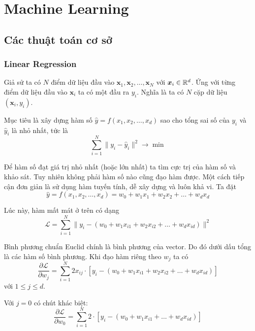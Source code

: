 \chapter{Machine Learning}

\section{Các thuật toán cơ sở}

\subsection*{Linear Regression}

Giả sử ta có $N$ điểm dữ liệu đầu vào $\bm{x}_1, \bm{x}_2, \ldots, \bm{x}_N$ với $\bm{x}_i \in \mathbb{R}^d$. Ứng với từng điểm dữ liệu đầu vào $\bm{x}_i$ ta có một đầu ra $y_i$. Nghĩa là ta có $N$ cặp dữ liệu $(\bm{x}_i, y_i)$.

Mục tiêu là xây dựng hàm số $\hat{y} = f(x_1, x_2, \ldots, x_d)$ sao cho tổng sai số của $y_i$ và $\hat{y}_i$ là nhỏ nhất, tức là \[ \sum_{i=1}^N \lVert y_i - \hat{y}_i \rVert^2 \to \min \]

Để hàm số đạt giá trị nhỏ nhất (hoặc lớn nhất) ta tìm cực trị của hàm số và khảo sát. Tuy nhiên không phải hàm số nào cũng đạo hàm được. Một cách tiếp cận đơn giản là sử dụng hàm tuyến tính, dễ xây dựng và luôn khả vi. Ta đặt \[ \hat{y} = f(x_1, x_2, \ldots, x_d) = w_0 + w_1 x_1 + w_2 x_2 + \ldots + w_d x_d \]

Lúc này, hàm mất mát ở trên có dạng
\begin{equation*}
    \mathcal{L} = \sum_{i=1}^N \lVert y_i - (w_0 + w_1 x_{i1} + w_2 x_{i2} + \ldots + w_d x_{id}) \rVert^2
\end{equation*}

Bình phương chuẩn Euclid chính là bình phương của vector. Do đó dưới dấu tổng là các hàm số bình phương. Khi đạo hàm riêng theo $w_j$ ta có
\begin{equation*}
    \dfrac{\partial \mathcal{L}}{\partial w_j} = \sum_{i=1}^N 2 x_{ij} \cdot \left[ y_i - (w_0 + w_1 x_{i1} + w_2 x_{i2} + \ldots + w_d x_{id}) \right]
\end{equation*}
với $1 \leqslant j \leqslant d$. 

Với $j = 0$ có chút khác biệt:
\begin{equation*}
    \dfrac{\partial \mathcal{L}}{\partial w_0} = \sum_{i=1}^N 2 \cdot \left[ y_i - (w_0 + w_1 x_{i1} + \ldots + w_d x_{id}) \right]
\end{equation*}

